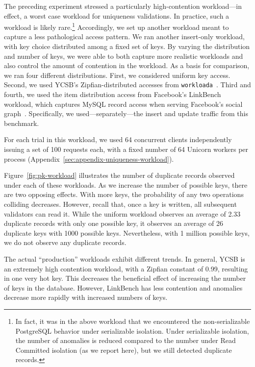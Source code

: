  The preceding experiment stressed a
particularly high-contention workload---in effect, a worst case
workload for uniqueness validations. In practice, such a workload is
likely rare.\footnote{In fact, it was in the above workload that we
  encountered the non-serializable PostgreSQL behavior under
  serializable isolation. Under serializable isolation, the number of
  anomalies is reduced compared to the number under Read Committed
  isolation (as we report here), but we still detected duplicate
  records.} Accordingly, we set up another workload meant to capture a
less pathological access pattern. We ran another insert-only workload,
with key choice distributed among a fixed set of keys. By varying the
distribution and number of keys, we were able to both capture more
realistic workloads and also control the amount of contention in the
workload. As a basis for comparison, we ran four different
distributions. First, we considered uniform key access. Second, we
used YCSB's Zipfian-distributed accesses from
\texttt{workloada}~\cite{ycsb}. Third and fourth, we used the item
distribution access from Facebook's LinkBench workload, which captures
MySQL record access when serving Facebook's social
graph~\cite{linkbench}. Specifically, we used---separately---the
insert and update traffic from this benchmark.

For each trial in this workload, we used 64 concurrent clients
independently issuing a set of 100 requests each, with a fixed number
of 64 Unicorn workers per process (Appendix~\ref{sec:appendix-uniqueness-workload}). 

Figure~\ref{fig:pk-workload} illustrates the number of duplicate
records observed under each of these workloads. As we increase the
number of possible keys, there are two opposing effects. With more
keys, the probability of any two operations colliding
decreases. However, recall that, once a key is written, all subsequent
validators can read it. While
the uniform workload observes an average of 2.33 duplicate records
with only one possible key, it observes an average of 26 duplicate
keys with 1000 possible keys. Nevertheless, with 1 million possible
keys, we do not observe any duplicate records.

The actual ``production'' workloads exhibit different trends. In
general, YCSB is an extremely high contention workload, with a Zipfian
constant of 0.99, resulting in one very hot key. This decreases the
beneficial effect of increasing the number of keys in the
database. However, LinkBench has less contention and anomalies decrease more
rapidly with increased numbers of keys.

